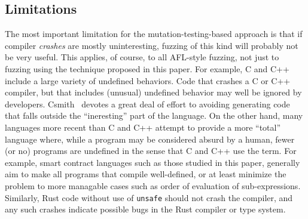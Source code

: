 \subsection{Limitations}

The most important limitation for the mutation-testing-based approach is that if compiler \emph{crashes} are mostly uninteresting, fuzzing of this kind will probably not be very useful.  This applies, of course, to all AFL-style fuzzing, not just to fuzzing using the technique proposed in this paper.  For example, C and C++ include a large variety of undefined behaviors.  Code that crashes a C or C++ compiler, but that includes (unusual) undefined behavior may well be ignored by developers.  Csmith~\cite{csmith} devotes a great deal of effort to avoiding generating code that falls outside the ``ineresting'' part of the language.  On the other hand, many languages more recent than C and C++ attempt to provide a more ``total'' language where, while a program may be considered absurd by a human, fewer (or no) programs are undefined in the sense that C and C++ use the term.  For example, smart contract languages such as those studied in this paper, generally aim to make all programs that compile well-defined, or at least minimize the problem to more managable cases such as order of evaluation of sub-expressions.  Similarly, Rust code without use of {\tt unsafe} should not crash the compiler, and any such crashes indicate possible bugs in the Rust compiler or type system.  